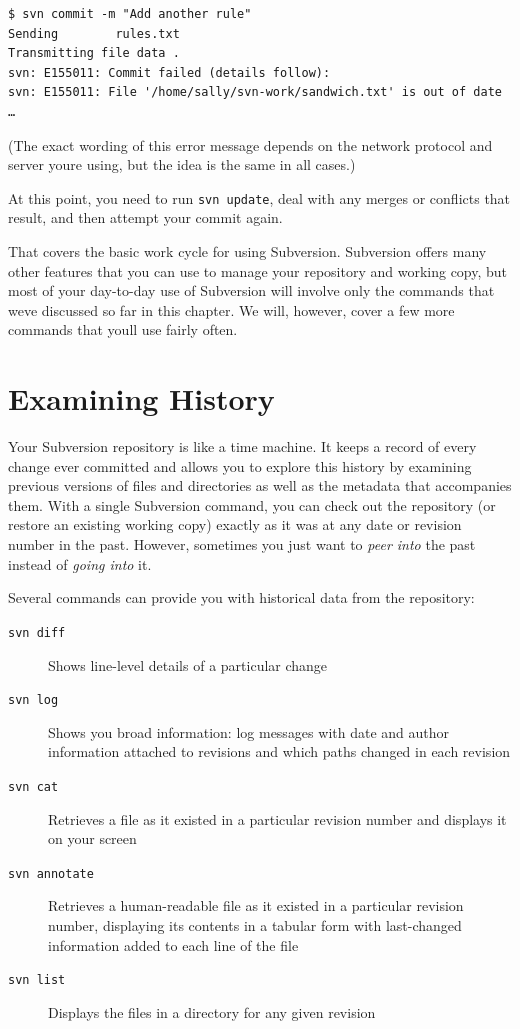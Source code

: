 \begin{verbatim}
$ svn commit -m "Add another rule"
Sending        rules.txt
Transmitting file data .
svn: E155011: Commit failed (details follow):
svn: E155011: File '/home/sally/svn-work/sandwich.txt' is out of date
…
\end{verbatim}

(The exact wording of this error message depends on the network protocol
and server you\textquotesingle re using, but the idea is the same in all
cases.)

At this point, you need to run \texttt{svn\ update}, deal with any
merges or conflicts that result, and then attempt your commit again.

That covers the basic work cycle for using Subversion. Subversion offers
many other features that you can use to manage your repository and
working copy, but most of your day-to-day use of Subversion will involve
only the commands that we\textquotesingle ve discussed so far in this
chapter. We will, however, cover a few more commands that
you\textquotesingle ll use fairly often.

\section{Examining History}\label{svn.tour.history}

Your Subversion repository is like a time machine. It keeps a record of
every change ever committed and allows you to explore this history by
examining previous versions of files and directories as well as the
metadata that accompanies them. With a single Subversion command, you
can check out the repository (or restore an existing working copy)
exactly as it was at any date or revision number in the past. However,
sometimes you just want to \emph{peer into} the past instead of
\emph{going into} it.

Several commands can provide you with historical data from the
repository:

\begin{description}
\item[\texttt{svn\ diff}]
Shows line-level details of a particular change
\item[\texttt{svn\ log}]
Shows you broad information: log messages with date and author
information attached to revisions and which paths changed in each
revision
\item[\texttt{svn\ cat}]
Retrieves a file as it existed in a particular revision number and
displays it on your screen
\item[\texttt{svn\ annotate}]
Retrieves a human-readable file as it existed in a particular revision
number, displaying its contents in a tabular form with last-changed
information added to each line of the file
\item[\texttt{svn\ list}]
Displays the files in a directory for any given revision
\end{description}

